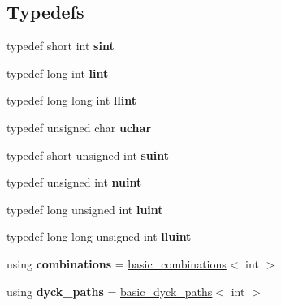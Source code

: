 \subsection*{Typedefs}
\begin{DoxyCompactItemize}
\item 
\hypertarget{namespacedscr_a06240e64f61885a0941bcfdbc308e5f8}{typedef short int {\bfseries sint}}\label{namespacedscr_a06240e64f61885a0941bcfdbc308e5f8}

\item 
\hypertarget{namespacedscr_a09efd5f0b2b5280feccf180e28f5dc66}{typedef long int {\bfseries lint}}\label{namespacedscr_a09efd5f0b2b5280feccf180e28f5dc66}

\item 
\hypertarget{namespacedscr_aa8dc355094ce471c030fb686b4efe7e4}{typedef long long int {\bfseries llint}}\label{namespacedscr_aa8dc355094ce471c030fb686b4efe7e4}

\item 
\hypertarget{namespacedscr_aef959cc88cd30ba20e71db0e149466d9}{typedef unsigned char {\bfseries uchar}}\label{namespacedscr_aef959cc88cd30ba20e71db0e149466d9}

\item 
\hypertarget{namespacedscr_a243efaeabda17ed6d2dcf4b63b4775eb}{typedef short unsigned int {\bfseries suint}}\label{namespacedscr_a243efaeabda17ed6d2dcf4b63b4775eb}

\item 
\hypertarget{namespacedscr_ab52fa03f5aba3a9c9bdb325cd797db1a}{typedef unsigned int {\bfseries nuint}}\label{namespacedscr_ab52fa03f5aba3a9c9bdb325cd797db1a}

\item 
\hypertarget{namespacedscr_a595212783637c92c51ad3e441d5cf561}{typedef long unsigned int {\bfseries luint}}\label{namespacedscr_a595212783637c92c51ad3e441d5cf561}

\item 
\hypertarget{namespacedscr_ada2b22ae43e61090315d40fff902199c}{typedef long long unsigned int {\bfseries lluint}}\label{namespacedscr_ada2b22ae43e61090315d40fff902199c}

\item 
\hypertarget{namespacedscr_ab95769996af308a443de2ad34f6ce524}{using {\bfseries combinations} = \hyperlink{classdscr_1_1basic__combinations}{basic\-\_\-combinations}$<$ int $>$}\label{namespacedscr_ab95769996af308a443de2ad34f6ce524}

\item 
\hypertarget{namespacedscr_a54492d17eda1c9f25abe5f136f08e7ff}{using {\bfseries dyck\-\_\-paths} = \hyperlink{classdscr_1_1basic__dyck__paths}{basic\-\_\-dyck\-\_\-paths}$<$ int $>$}\label{namespacedscr_a54492d17eda1c9f25abe5f136f08e7ff}


\end{DoxyCompactItemize}

